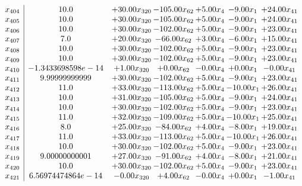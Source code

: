 \documentclass[8pt]{article}
\begin{document}
\[\begin{array}{c| c c@{\hskip 2pt} c@{\hskip 2pt} c@{\hskip 2pt} c@{\hskip 2pt} c@{\hskip 2pt} }
 x_{404}   &  10.0 & + 30.00 x_{320} & -105.00 x_{62} & +  5.00 x_{4} & -9.00 x_{1} & + 24.00 x_{41}\\
 x_{405}   &  10.0 & + 30.00 x_{320} & -105.00 x_{62} & +  5.00 x_{4} & -9.00 x_{1} & + 24.00 x_{41}\\
 x_{406}   &  10.0 & + 30.00 x_{320} & -102.00 x_{62} & +  5.00 x_{4} & -9.00 x_{1} & + 23.00 x_{41}\\
 x_{407}   &  7.0 & + 20.00 x_{320} & -66.00 x_{62} & +  3.00 x_{4} & -6.00 x_{1} & + 15.00 x_{41}\\
 x_{408}   &  10.0 & + 30.00 x_{320} & -102.00 x_{62} & +  5.00 x_{4} & -9.00 x_{1} & + 23.00 x_{41}\\
 x_{409}   &  10.0 & + 30.00 x_{320} & -102.00 x_{62} & +  5.00 x_{4} & -9.00 x_{1} & + 23.00 x_{41}\\
 x_{410}   &  -1.3433698598e-14 & +  1.00 x_{320} & +  0.00 x_{62} & -0.00 x_{4} & +  0.00 x_{1} & -0.00 x_{41}\\
 x_{411}   &  9.99999999999 & + 30.00 x_{320} & -102.00 x_{62} & +  5.00 x_{4} & -9.00 x_{1} & + 23.00 x_{41}\\
 x_{412}   &  11.0 & + 33.00 x_{320} & -113.00 x_{62} & +  5.00 x_{4} & -10.00 x_{1} & + 26.00 x_{41}\\
 x_{413}   &  10.0 & + 31.00 x_{320} & -105.00 x_{62} & +  5.00 x_{4} & -9.00 x_{1} & + 24.00 x_{41}\\
 x_{414}   &  10.0 & + 30.00 x_{320} & -102.00 x_{62} & +  5.00 x_{4} & -9.00 x_{1} & + 23.00 x_{41}\\
 x_{415}   &  11.0 & + 32.00 x_{320} & -109.00 x_{62} & +  5.00 x_{4} & -10.00 x_{1} & + 25.00 x_{41}\\
 x_{416}   &  8.0 & + 25.00 x_{320} & -84.00 x_{62} & +  4.00 x_{4} & -8.00 x_{1} & + 19.00 x_{41}\\
 x_{417}   &  11.0 & + 33.00 x_{320} & -113.00 x_{62} & +  5.00 x_{4} & -10.00 x_{1} & + 26.00 x_{41}\\
 x_{418}   &  10.0 & + 30.00 x_{320} & -102.00 x_{62} & +  5.00 x_{4} & -9.00 x_{1} & + 23.00 x_{41}\\
 x_{419}   &  9.00000000001 & + 27.00 x_{320} & -91.00 x_{62} & +  4.00 x_{4} & -8.00 x_{1} & + 21.00 x_{41}\\
 x_{420}   &  10.0 & + 30.00 x_{320} & -102.00 x_{62} & +  5.00 x_{4} & -9.00 x_{1} & + 23.00 x_{41}\\
 x_{421}   &  6.56974474864e-14 & -0.00 x_{320} & +  4.00 x_{62} & -0.00 x_{4} & +  0.00 x_{1} & -1.00 x_{41}\\

\end{array}\]
\end{document}
